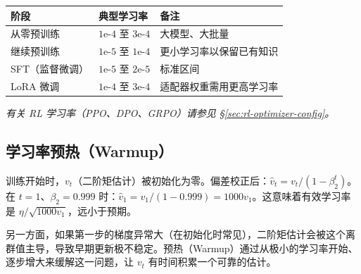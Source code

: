 \begin{keybox}[各训练阶段的典型学习率]
\begin{center}
\begin{tabular}{@{}l l l@{}}
\toprule
\textbf{阶段} & \textbf{典型学习率} & \textbf{备注} \\
\midrule
从零预训练 & $1\text{e-}4$ 至 $3\text{e-}4$ & 大模型、大批量 \\
继续预训练 & $1\text{e-}5$ 至 $1\text{e-}4$ & 更小学习率以保留已有知识 \\
SFT（监督微调） & $1\text{e-}5$ 至 $2\text{e-}5$ & 标准区间 \\
LoRA 微调 & $1\text{e-}4$ 至 $3\text{e-}4$ & 适配器权重需用更高学习率 \\
\bottomrule
\end{tabular}
\end{center}

\smallskip
\noindent\emph{有关 RL 学习率（PPO、DPO、GRPO）请参见 §\ref{sec:rl-optimizer-config}。}
\end{keybox}

\subsection{学习率预热（Warmup）}
\label{learning-rate-warmup}

\begin{keybox}[为何需要预热]
训练开始时，$v_t$（二阶矩估计）被初始化为零。偏差校正后：$\hat{v}_t = v_t / (1 - \beta_2^t)$。在 $t=1$、$\beta_2 = 0.999$ 时：$\hat{v}_1 = v_1 / (1 - 0.999) = 1000 v_1$。这意味着有效学习率是 $\eta / \sqrt{1000 v_1}$，远小于预期。

另一方面，如果第一步的梯度异常大（在初始化时常见），二阶矩估计会被这个离群值主导，导致早期更新极不稳定。预热（Warmup）通过从极小的学习率开始、逐步增大来缓解这一问题，让 $v_t$ 有时间积累一个可靠的估计。
\end{keybox}

